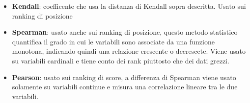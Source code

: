\begin{itemize}
\item \textbf{Kendall}: coefficente che usa la distanza di Kendall sopra descritta. Usato sui ranking di posizione
\item \textbf{Spearman}: usato anche sui ranking di posizione, questo metodo statistico quantifica il grado in cui le variabili sono associate da una funzione monotona, indicando quindi una relazione crescente o decrescete. Viene usato su variabili cardinali e tiene conto dei rank piuttosto che dei dati grezzi.
\item \textbf{Pearson}: usato sui ranking di score, a differenza di Spearman viene usato solamente su variabili continue e misura una correlazione lineare tra le due variabili.
\end{itemize}

